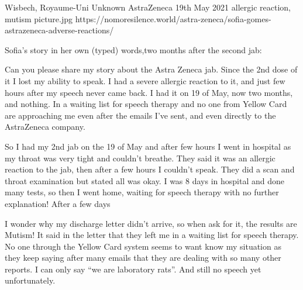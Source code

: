           {Wisbech, Royaume-Uni}
          {Unknown}
          {AstraZeneca}
          {19th May 2021}
          {allergic reaction, mutism}
          {picture.jpg}
          {https://nomoresilence.world/astra-zeneca/sofia-gomes-astrazeneca-adverse-reactions/}
          {

Sofia's story in her own (typed) words,two months after the second jab:

Can you please share my story about the Astra Zeneca jab. Since the 2nd dose of
it I lost my ability to speak. I had a severe allergic reaction to it, and just
few hours after my speech never came back. I had it on 19 of May, now two
months, and nothing. In a waiting list for speech therapy and no one from Yellow
Card are approaching me even after the emails I've sent, and even directly to
the AstraZeneca company.

So I had my 2nd jab on the 19 of May and after few hours I went in hospital as
my throat was very tight and couldn't breathe. They said it was an allergic
reaction to the jab, then after a few hours I couldn't speak. They did a scan
and throat examination but stated all was okay. I was 8 days in hospital and
done many tests, so then I went home, waiting for speech therapy with no further
explanation! After a few days

I wonder why my discharge letter didn't arrive, so when ask for it, the results
are Mutism! It said in the letter that they left me in a waiting list for speech
therapy. No one through the Yellow Card system seems to want know my situation
as they keep saying after many emails that they are dealing with so many other
reports.  I can only say ``we are laboratory rats''.  And still no speech yet
unfortunately.

}
